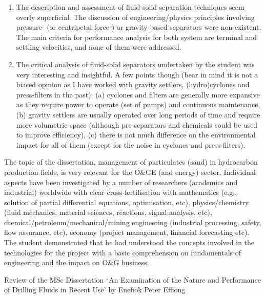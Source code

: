 \documentclass[14pt,twoside]{report}
\begin{document}
\begin{enumerate}
%
\item The description and assessment of fluid-solid separation techniques seem overly superficial. The discussion of engineering/physics principles involving pressure- (or centripetal force-) or gravity-based separators were non-existent. The main criteria for performance analysis for both system are terminal and settling velocities, and none of them were addressed.
%
\item The critical analysis of fluid-solid separators undertaken by the student was very interesting and insightful. A few points though (bear in mind it is not a biased opinion as I have worked with gravity settlers, (hydro)cyclones and press-filters in the past): (a) cyclones and filters are generally more expansive as they require power to operate (set of pumps) and continuous maintenance, (b) gravity settlers are usually operated over long periods of time and require more volumetric space (although pre-separators and chemicals could be used to improve efficiency), (c) there is not much difference on the environmental impact for all of them (except for the noise in cyclones and press-filters).   
%
\end{enumerate}

The topic of the dissertation, management of particulates (sand) in hydrocarbon production fields, is very relevant for the O$\&$GE (and energy) sector. Individual aspects have been investigated by a number of researchers (academics and industrial) worldwide with clear cross-fertilisation with mathematics (e.g., solution of partial differential equations, optimisation, etc), physics/chemistry (fluid mechanics, material sciences, reactions, signal analysis, etc), chemical/petroleum/mechanical/mining engineering (industrial processing, safety, flow assurance, etc), economy (project management, financial forecasting etc). The student demonstrated that he had understood the concepts involved in the technologies for the project with a basic comprehension on fundamentals of engineering and the impact on O$\&$G business.    



\clearpage


\medskip

\begin{center}
{\Large Review of the MSc Dissertation $\lq$An Examination of the Nature and Performance of Drilling Fluids in Recent Use' by Enefiok Peter Effiong}
\end{center}
\end{document}
